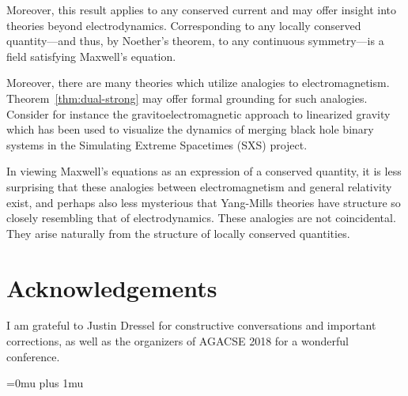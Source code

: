 \documentclass[twocolumn,notitlepage,nofootinbib,tightenlines]{revtex4-1}
\theoremstyle{definition}
\theoremstyle{remark}
\numberwithin{equation}{section}
\begin{document}
Moreover, this result applies to any conserved current and may offer insight into theories beyond electrodynamics. Corresponding to any locally conserved quantity---and thus, by Noether's theorem, to any continuous symmetry---is a field satisfying Maxwell's equation.

Moreover, there are many theories which utilize analogies to electromagnetism. Theorem~\ref{thm:dual-strong} may offer formal grounding for such analogies. Consider for instance the gravitoelectromagnetic approach to linearized gravity\cite{mashhoon} which has been used to visualize the dynamics of merging black hole binary systems in the Simulating Extreme Spacetimes (SXS) project\cite{owen}.

In viewing Maxwell's equations as an expression of a conserved quantity, it is less surprising that these analogies between electromagnetism and general relativity exist, and perhaps also less mysterious that Yang-Mills theories have structure so closely resembling that of electrodynamics. These analogies are not coincidental. They arise naturally from the structure of locally conserved quantities.

\section*{Acknowledgements}

I am grateful to Justin Dressel for constructive conversations and important corrections, as well as the organizers of AGACSE 2018 for a wonderful conference.

\Urlmuskip=0mu plus 1mu


\end{document}
